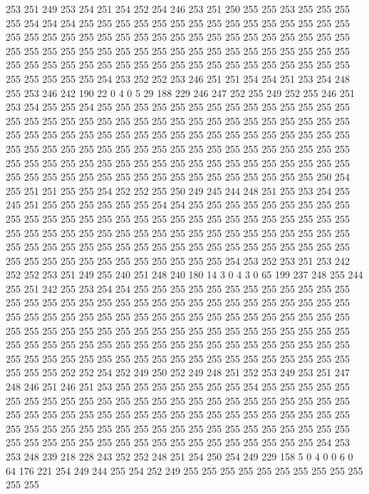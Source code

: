 253 251 249 253 254 251 254 252 254 246 253 251 250 255 255 253 255 255 255 255
254 254 254 255 255 255 255 255 255 255 255 255 255 255 255 255 255 255 255 255
255 255 255 255 255 255 255 255 255 255 255 255 255 255 255 255 255 255 255 255
255 255 255 255 255 255 255 255 255 255 255 255 255 255 255 255 255 255 255 255
255 255 255 255 255 255 255 255 255 255 255 255 255 255 255 255 255 255 255 255
254 253 252 252 253 246 251 251 254 254 251 253 254 248 255 253 246 242 190 22
0 4 0 5 29 188 229 246 247 252 255 249 252 255 246 251 253 254 255 255
254 255 255 255 255 255 255 255 255 255 255 255 255 255 255 255 255 255 255 255
255 255 255 255 255 255 255 255 255 255 255 255 255 255 255 255 255 255 255 255
255 255 255 255 255 255 255 255 255 255 255 255 255 255 255 255 255 255 255 255
255 255 255 255 255 255 255 255 255 255 255 255 255 255 255 255 255 255 255 255
255 255 255 255 255 255 255 255 255 255 255 255 255 255 255 255 255 255 255 255
255 255 255 255 255 255 255 255 250 254 255 251 251 255 255 254 252 252 255 250
249 245 244 248 251 255 253 254 255 245 251 255 255 255 255 255 255 254 254 255
255 255 255 255 255 255 255 255 255 255 255 255 255 255 255 255 255 255 255 255
255 255 255 255 255 255 255 255 255 255 255 255 255 255 255 255 255 255 255 255
255 255 255 255 255 255 255 255 255 255 255 255 255 255 255 255 255 255 255 255
255 255 255 255 255 255 255 255 255 255 255 255 255 255 255 255 255 254 253 252
253 251 253 242 252 252 253 251 249 255 240 251 248 240 180 14 3 0 4 3
0 65 199 237 248 255 244 255 251 242 255 253 254 254 255 255 255 255 255 255
255 255 255 255 255 255 255 255 255 255 255 255 255 255 255 255 255 255 255 255
255 255 255 255 255 255 255 255 255 255 255 255 255 255 255 255 255 255 255 255
255 255 255 255 255 255 255 255 255 255 255 255 255 255 255 255 255 255 255 255
255 255 255 255 255 255 255 255 255 255 255 255 255 255 255 255 255 255 255 255
255 255 255 255 255 255 255 255 255 255 255 255 255 255 255 255 255 255 255 255
255 255 255 255 252 252 254 252 249 250 252 249 248 251 252 253 249 253 251 247
248 246 251 246 251 253 255 255 255 255 255 255 255 254 255 255 255 255 255 255
255 255 255 255 255 255 255 255 255 255 255 255 255 255 255 255 255 255 255 255
255 255 255 255 255 255 255 255 255 255 255 255 255 255 255 255 255 255 255 255
255 255 255 255 255 255 255 255 255 255 255 255 255 255 255 255 255 255 255 255
255 255 255 255 255 255 255 255 255 255 255 255 255 254 253 253 248 239 218 228
243 252 252 248 251 254 250 254 249 229 158 5 0 4 0 0 6 0 64 176
221 254 249 244 255 254 252 249 255 255 255 255 255 255 255 255 255 255 255 255
